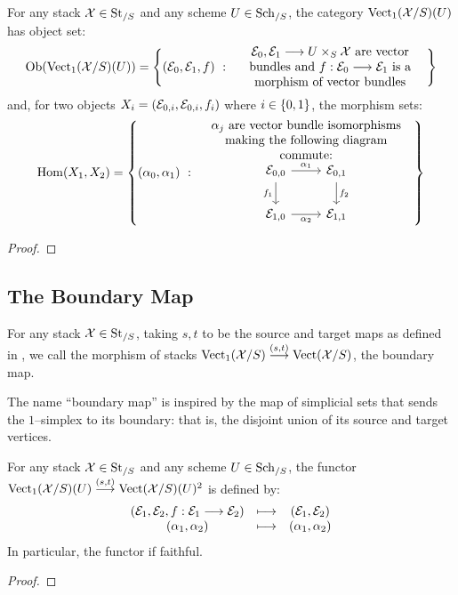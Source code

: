\documentclass[11pt]{amsart}
\begin{document}
\begin{thm}
For any stack $\mathcal{X} \in \mathrm{St}_{/S}$ and any scheme $U \in \mathrm{Sch}_{/S}$,
the category $\mathrm{Vect}_1(\mathcal{X}/S)(U)$ has object set:
\[
\Ob{\Vect_1(\mcX/S)(U)} = 
\set[{
  (\mc{E}_0, \mc{E}_1, f)
}]{
  \parbox{0.45\textwidth}{\centering
    $\mc{E}_0, \mc{E}_1 \to U \times_S \mcX$ are vector bundles and
    $f : \mc{E}_0 \to \mc{E}_1$ is a morphism of vector bundles
  }
}
\]
and, for two objects $X_i = (\mathcal{E}_{0, i}, \mathcal{E}_{0, i}, f_i)$ where
$i \in \set{0, 1}$, the morphism sets:
\[
\Hom(X_1, X_2) =
\set[{(\alpha_0, \alpha_1)}]{
\parbox{0.5\textwidth}{\centering
  $\alpha_j$ are vector bundle isomorphisms
  making the following diagram commute:\\
  \begin{tikzcd}[ampersand replacement=\&]
    \mc{E}_{0, 0} \ar[r, "\alpha_1"] \ar[d, "f_1" left] \&
    \mc{E}_{0, 1} \ar[d, "f_2"] \\
    \mc{E}_{1, 0} \ar[r, "\alpha_2" below] \&
    \mc{E}_{1, 1}
  \end{tikzcd}
}
}
\]
\end{thm}
\begin{proof}
\end{proof}

\subsection{The Boundary Map}

\begin{defn}
For any stack $\mathcal{X} \in \mathrm{St}_{/S}$, taking $s, t$ to be the source and target
maps as defined in \cite[\S 3]{ModQuivBun}, we call the morphism of stacks
$\Vect_1(\mcX/S) \to[{(s, t)}] \Vect(\mcX/S)$, the boundary map.
\end{defn}

\begin{rmk}
The name ``boundary map'' is inspired by the map of simplicial sets
that sends the $1$--simplex to its boundary: that is, the disjoint union
of its source and target vertices.
\end{rmk}

\begin{thm}\label{thm:boundary-map-fibre-functor}
For any stack $\mathcal{X} \in \mathrm{St}_{/S}$ and any scheme $U \in \mathrm{Sch}_{/S}$,
the functor $\Vect_1(\mcX/S)(U) \to[{(s, t)}] \Vect(\mcX/S)(U)^2$
is defined by:
\[\begin{array}{ccc}
(\mc{E}_1, \mc{E}_2, f : \mc{E}_1 \to \mc{E}_2)
&\mapsto& (\mc{E}_1, \mc{E}_2) \\
(\alpha_1, \alpha_2) & \mapsto & (\alpha_1, \alpha_2)
\end{array}\]
In particular, the functor if faithful.
\end{thm}
\begin{proof}
\end{proof}
\end{document}
